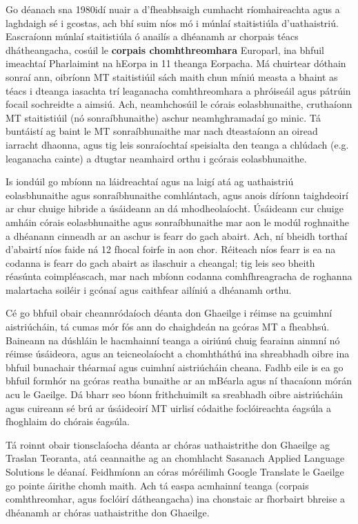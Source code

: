 \begin{multicols}{2}
Go déanach sna 1980idí nuair a d’fheabhsaigh cumhacht ríomhaireachta agus a laghdaigh sé i gcostas, ach bhí suim níos mó i múnlaí staitistiúla d’uathaistriú. Eascraíonn múnlaí staitistiúla ó anailís a dhéanamh ar chorpais téacs dhátheangacha, cosúil le \textbf{corpais chomhthreomhara} Europarl, ina bhfuil imeachtaí Pharlaimint na hEorpa in 11 theanga Eorpacha. Má chuirtear dóthain sonraí ann, oibríonn MT staitistiúil sách maith chun míniú measta a bhaint as téacs i dteanga iasachta trí leaganacha comhthreomhara a phróiseáil agus pátrúin focail sochreidte a aimsiú. Ach, neamhchosúil le córais eolasbhunaithe, cruthaíonn MT staitistiúil (nó sonraíbhunaithe) aschur neamhghramadaí go minic. Tá buntáistí ag baint le MT sonraíbhunaithe mar nach dteastaíonn an oiread iarracht dhaonna, agus tig leis sonraíochtaí speisialta den teanga a chlúdach (e.g. leaganacha cainte) a dtugtar neamhaird orthu i gcórais eolasbhunaithe. 

Is iondúil go mbíonn na láidreachtaí agus na laigí atá ag uathaistriú eolasbhunaithe agus sonraíbhunaithe comhlántach, agus anois díríonn taighdeoirí ar chur chuige hibride a úsáideann an dá mhodheolaíocht. Úsáideann cur chuige amháin córais eolasbhunaithe agus sonraíbhunaithe mar aon le modúl roghnaithe a dhéanann cinneadh ar an aschur is fearr do gach abairt. Ach, ní bheidh torthaí d'abairtí níos faide ná 12 fhocal foirfe in aon chor. Réiteach níos fearr is ea na codanna is fearr do gach abairt as ilaschuir a cheangal; tig leis seo bheith réasúnta coimpléascach, mar nach mbíonn codanna comhfhreagracha de roghanna malartacha soiléir i gcónaí agus caithfear ailíniú a dhéanamh orthu. 


Cé go bhfuil obair cheannródaíoch déanta don Ghaeilge i réimse na gcuimhní aistriúcháin, tá cumas mór fós ann do chaighdeán na gcóras MT a fheabhsú. Baineann na dúshláin le hacmhainní teanga a oiriúnú chuig fearainn ainmní nó réimse úsáideora, agus an teicneolaíocht a chomhtháthú ina shreabhadh oibre ina bhfuil bunachair théarmaí agus cuimhní aistriúcháin cheana. Fadhb eile is ea go bhfuil formhór na gcóras reatha bunaithe ar an mBéarla agus ní thacaíonn mórán acu le Gaeilge. Dá bharr seo bíonn frithchuimilt sa sreabhadh oibre aistriúcháin agus cuireann sé brú ar úsáideoirí MT uirlisí códaithe foclóireachta éagsúla a fhoghlaim do chórais éagsúla. 

Tá roinnt obair tionsclaíocha déanta ar chóras uathaistrithe don Ghaeilge ag Traslan Teoranta, atá ceannaithe ag an chomhlacht Sasanach Applied Language Solutions le déanaí. Feidhmíonn an córas móréilimh Google Translate le Gaeilge go pointe áirithe chomh maith. Ach tá easpa acmhainní teanga (corpais comhthreomhar, agus foclóirí dátheangacha) ina chonstaic ar fhorbairt bhreise a dhéanamh ar chóras uathaistrithe don Ghaeilge.


\end{multicols}
